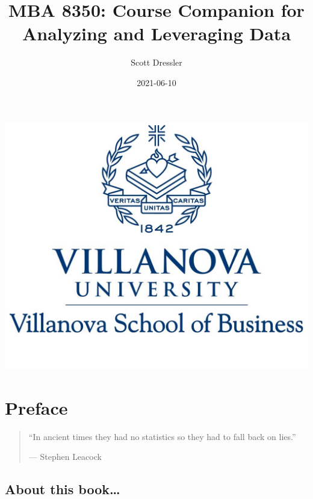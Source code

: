 \documentclass[
]{book}
\title{MBA 8350: Course Companion for Analyzing and Leveraging Data}
\author{Scott Dressler}
\date{2021-06-10}
\begin{document}
\maketitle

{
\setcounter{tocdepth}{1}
\tableofcontents
}
\hypertarget{section}{%
\chapter*{}\label{section}}

\begin{center}\includegraphics[width=14.36in]{images/VU17BLUE3} \end{center}

\hypertarget{preface}{%
\chapter*{Preface}\label{preface}}

\begin{quote}
``In ancient times they had no statistics so they had to fall back on lies.''

--- Stephen Leacock
\end{quote}

\hypertarget{about-this-book}{%
\section*{About this book\ldots{}}\label{about-this-book}}
\end{document}
